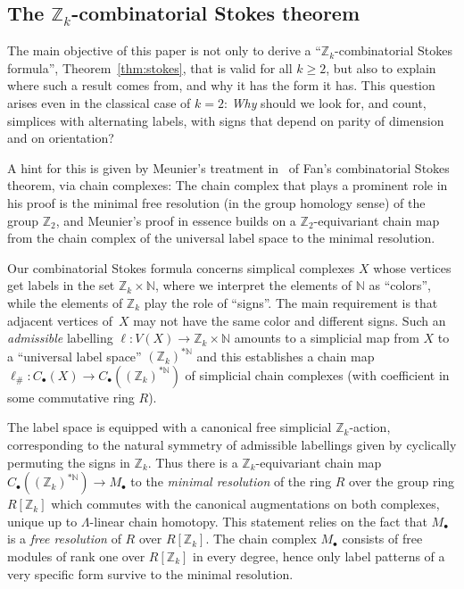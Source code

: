 \documentclass[11pt,a4paper,draft]{article}
\newcommand{\Z}{{\mathbb Z}}
\newcommand{\N}{{\mathbb N}}
\theoremstyle{definition}
\begin{document}
\subsection{The \boldmath$\Z_k$-combinatorial Stokes theorem}%
\label{ssec:plan}

The main objective of this paper is not only to derive a
``$\Z_k$-combinatorial Stokes formula'', Theorem~\ref{thm:stokes},
that is valid for all $k\ge2$, but also to
explain where such a result comes from, and why it has the form it has.
This question arises even in the classical case of $k=2$:
\emph{Why} should we look for, and count, simplices with
alternating labels, with signs that depend on
parity of dimension and on orientation?

A hint for this is given by Meunier's treatment
in~\cite{meunier06:_spern} of Fan's
combinatorial Stokes theorem, via chain complexes:
The chain complex that plays a prominent role in his proof is the
minimal free resolution (in the group homology sense) of the group
$\Z_2$, and Meunier's proof in essence builds on a
$\Z_2$-equivariant chain map from the chain complex of the universal label space to the minimal resolution.

Our combinatorial Stokes formula
concerns simplical complexes $X$ whose vertices get labels in the set
$\Z_k\times\N$, where we interpret the elements of $\N$ as ``colors'',
while the elements of $\Z_k$  play the role of
``signs''. The main requirement is that adjacent vertices of~$X$
may not have the same color and different signs.
Such an \emph{admissible} labelling $\ell:V(X)\rightarrow\Z_k\times\N$
amounts to a simplicial map from $X$ to a
``universal label space''  $(\Z_k)^{*\N}$ and this establishes a chain map
$\ell_\#:C_\bullet(X)\rightarrow C_\bullet((\Z_k)^{*\N})$ of simplicial
chain complexes (with coefficient in some commutative ring $R$).

The label space is equipped with a canonical free simplicial $\Z_k$-action, corresponding
to the natural symmetry of admissible labellings given  by cyclically permuting the signs in $\Z_k$.
Thus there is a $\Z_k$-equivariant chain map
$C_\bullet((\Z_k)^{*\N})\rightarrow M_\bullet$ to the
\emph{minimal resolution} of the ring $R$ over the
group ring $R[\Z_k]$ which commutes
with the canonical augmentations on both complexes,
unique up to $\Lambda$-linear chain homotopy.
This statement relies on the fact that $M_\bullet$ is
a \emph{free resolution} of $R$ over $R[\Z_k]$.
The chain complex $M_\bullet$ consists of free modules of rank one over $R[\Z_k]$ in every degree,  
hence only label patterns of a very specific form survive to the minimal resolution.
\end{document}
